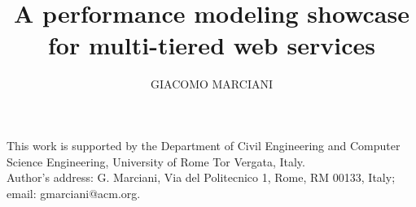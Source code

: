 \documentclass[acmutv-cw-pmcsn]{acmlarge}
\title{A performance modeling showcase for multi-tiered web services}
\author{GIACOMO MARCIANI \affil{University of Rome Tor Vergata}}
\numberwithin{equation}{section}
\begin{document}
\begin{bottomstuff}
This work is supported by the Department of Civil Engineering and Computer Science
Engineering, University of Rome Tor Vergata, Italy.\\
Author's address: G. Marciani, Via del Politecnico 1, Rome, RM 00133, Italy;
email: gmarciani@acm.org.
\end{bottomstuff}

\maketitle


















\elecappendix




\end{document}
